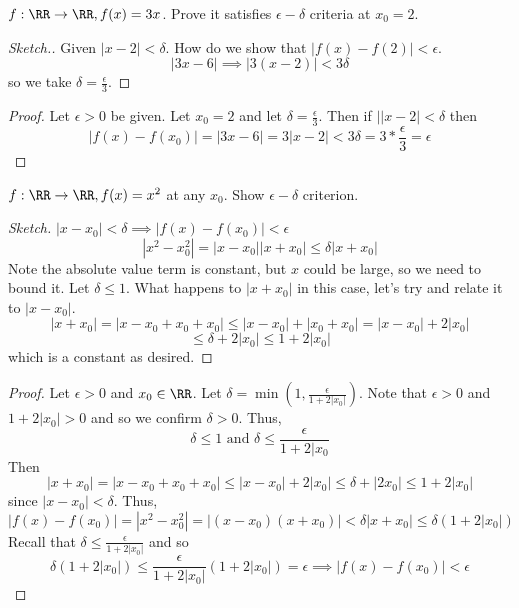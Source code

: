 \documentclass[12pt]{scrartcl}
\begin{document}
\begin{example}
  $f: \RR \to \RR, f(x) = 3x$. Prove it satisfies $\epsilon-\delta$ criteria at 
  $x_0 = 2$. 

  \begin{proof}[Sketch.]
    Given $|x - 2| < \delta$. How do we show that $|f(x) - f(2)| < \epsilon$. 
    \[|3x-6| \implies |3(x-2)| < 3\delta\]
    so we take $\delta = \frac{\epsilon}{3}$. 
  \end{proof}

  \begin{proof}
    Let $\epsilon > 0$ be given. Let $x_0 = 2$ and let $\delta = \frac{\epsilon}{3}$. 
    Then if $||x-2| < \delta$ then 
    \[|f(x) - f(x_0)| = |3x-6| = 3|x-2| < 3\delta = 3 * \frac{\epsilon}{3} = \epsilon\]
  \end{proof}
\end{example}

\begin{example}
  
  $f: \RR\to\RR, f(x) = x^2$ at any $x_0$. Show $\epsilon-\delta$ criterion.

  \begin{proof}[Sketch]
    $|x-x_0| < \delta \implies |f(x) - f(x_0)| < \epsilon$
    \[|x^2 - x_0^2| = |x-x_0||x+x_0| \leq \delta |x + x_0|\]
    Note the absolute value term is constant, but $x$ could be large, so we need to bound it. 
    Let $\delta \leq 1$. What happens to $|x + x_0|$ in this case, let's try and relate it to 
    $|x-x_0|$. 
    \[|x + x_0| = |x - x_0 + x_0 + x_0| \leq |x-x_0| + |x_0 + x_0| = |x-x_0| + 2|x_0|\]
    \[\leq \delta + 2|x_0| \leq 1 + 2|x_0|\]
    which is a constant as desired. 
  \end{proof}

  \begin{proof}
    Let $\epsilon > 0$ and $x_0\in\RR$. Let $\delta = \min(1, \frac{\epsilon}{1 + 2|x_0|})$. Note that 
    $\epsilon > 0$ and $1 + 2|x_0| > 0$ and so we confirm $\delta > 0$. Thus, 
    \[\delta \leq 1 \text{ and } \delta \leq \frac{\epsilon}{1 + 2|x_0}\]
    Then
    \[|x + x_0| = |x -x_0 + x_0 + x_0| \leq |x-x_0| + 2|x_0| \leq \delta + |2x_0| \leq 1 + 2|x_0|\]
    since $|x-x_0| < \delta$. Thus, 
    \[|f(x) - f(x_0)| = |x^2 - x_0^2| = |(x-x_0)(x+x_0)| < \delta |x+x_0| \leq \delta (1 + 2|x_0|)\]
    Recall that $\delta \leq \frac{\epsilon}{1 + 2|x_0|}$ and so 
    \[\delta (1 + 2|x_0|) \leq \frac{\epsilon}{1 + 2|x_0|}(1 + 2|x_0|) = \epsilon \implies |f(x) - f(x_0)| < \epsilon\]
  \end{proof}
\end{example}
\end{document}
